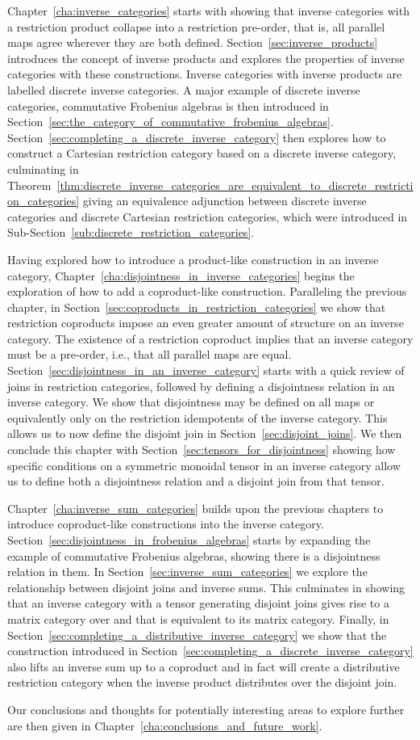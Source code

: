 Chapter~\ref{cha:inverse_categories} starts with showing that inverse categories with a restriction
product collapse into a restriction pre-order, that is, all parallel maps agree wherever they are
both defined. Section~\ref{sec:inverse_products} introduces the concept of inverse products and
explores the properties of inverse categories with these constructions. Inverse categories with
inverse products are labelled discrete inverse categories. A major example of discrete inverse
categories, commutative Frobenius algebras is then introduced in
Section~\ref{sec:the_category_of_commutative_frobenius_algebras}.
Section~\ref{sec:completing_a_discrete_inverse_category} then explores how to construct a Cartesian
restriction category based on a discrete inverse category, culminating in
Theorem~\ref{thm:discrete_inverse_categories_are_equivalent_to_discrete_restriction_categories}
giving an equivalence adjunction between discrete inverse categories and discrete Cartesian
restriction categories, which were introduced in Sub-Section~\ref{sub:discrete_restriction_categories}.

Having explored how to introduce a product-like construction in an inverse category,
Chapter~\ref{cha:disjointness_in_inverse_categories} begins the exploration of how to add a
coproduct-like construction. Paralleling the previous chapter, in
Section~\ref{sec:coproducts_in_restriction_categories} we show that restriction coproducts
impose an even greater amount of structure on an inverse category. The existence of a restriction
coproduct implies that an inverse category must be a pre-order, i.e., that all parallel maps are
equal. Section~\ref{sec:disjointness_in_an_inverse_category} starts with a quick review of joins in
restriction categories, followed by defining a disjointness relation in an inverse category. We show
that disjointness may be defined on all maps or equivalently only on the restriction idempotents of
the inverse category. This allows us to now define the disjoint join in
Section~\ref{sec:disjoint_joins}. We then conclude this chapter with
Section~\ref{sec:tensors_for_disjointness} showing how specific conditions on a symmetric monoidal
tensor in an inverse category allow us to define both a disjointness relation and a disjoint join
from that tensor.

Chapter~\ref{cha:inverse_sum_categories} builds upon the previous chapters to introduce
coproduct-like constructions into the inverse
category. Section~\ref{sec:disjointness_in_frobenius_algebras} starts by expanding the example of
commutative Frobenius algebras, showing there is a disjointness relation in them. In
Section~\ref{sec:inverse_sum_categories} we explore the relationship between disjoint joins and
inverse sums. This culminates in showing that an inverse category \X with a tensor generating disjoint
joins gives rise to a matrix category over \X and that \X is equivalent to its matrix
category. Finally, in Section~\ref{sec:completing_a_distributive_inverse_category} we show that the
construction introduced in Section~\ref{sec:completing_a_discrete_inverse_category} also lifts an
inverse sum up to a coproduct and in fact will create a distributive restriction category when the
inverse product distributes over the disjoint join.

Our conclusions and thoughts for potentially interesting areas to explore further are then given in
Chapter~\ref{cha:conclusions_and_future_work}.



